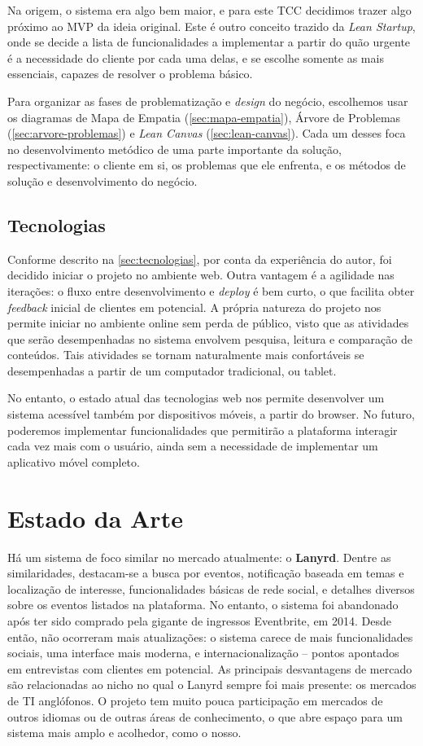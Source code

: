 \documentclass[12pt,a4paper,twoside,hyphens,english,brazil]{abntex2}
\begin{document}
Na origem, o sistema era algo bem maior, e para este TCC decidimos trazer algo próximo ao MVP da ideia original. Este é outro conceito trazido da \emph{Lean Startup}, onde se decide a lista de funcionalidades a implementar a partir do quão urgente é a necessidade do cliente por cada uma delas, e se escolhe somente as mais essenciais, capazes de resolver o problema básico.

Para organizar as fases de problematização e \emph{design} do negócio, escolhemos usar os diagramas de Mapa de Empatia (\autoref{sec:mapa-empatia}), Árvore de Problemas (\autoref{sec:arvore-problemas}) e \emph{Lean Canvas} (\autoref{sec:lean-canvas}). Cada um desses foca no desenvolvimento metódico de uma parte importante da solução, respectivamente: o cliente em si, os problemas que ele enfrenta, e os métodos de solução e desenvolvimento do negócio.

\subsection{Tecnologias}
Conforme descrito na \autoref{sec:tecnologias}, por conta da experiência do autor, foi decidido iniciar o projeto no ambiente web. Outra vantagem é a agilidade nas iterações: o fluxo entre desenvolvimento e \emph{deploy} é bem curto, o que facilita obter \emph{feedback} inicial de clientes em potencial. A própria natureza do projeto nos permite iniciar no ambiente online sem perda de público, visto que as atividades que serão desempenhadas no sistema envolvem pesquisa, leitura e comparação de conteúdos. Tais atividades se tornam naturalmente mais confortáveis se desempenhadas a partir de um computador tradicional, ou tablet.

No entanto, o estado atual das tecnologias web nos permite desenvolver um sistema acessível também por dispositivos móveis, a partir do browser. No futuro, poderemos implementar funcionalidades que permitirão a plataforma interagir cada vez mais com o usuário, ainda sem a necessidade de implementar um aplicativo móvel completo.\cite{bitbucket-mobile-milestone}

\section{Estado da Arte} \label{sec:estado_arte}
Há um sistema de foco similar no mercado atualmente: o \textbf{Lanyrd}. Dentre as similaridades, destacam-se a busca por eventos, notificação baseada em temas e localização de interesse, funcionalidades básicas de rede social, e detalhes diversos sobre os eventos listados na plataforma. No entanto, o sistema foi abandonado após ter sido comprado pela gigante de ingressos Eventbrite, em 2014.\cite{lanyrd-abandonado} Desde então, não ocorreram mais atualizações: o sistema carece de mais funcionalidades sociais, uma interface mais moderna, e internacionalização -- pontos apontados em entrevistas com clientes em potencial. As principais desvantagens de mercado são relacionadas ao nicho no qual o Lanyrd sempre foi mais presente: os mercados de TI anglófonos. O projeto tem muito pouca participação em mercados de outros idiomas ou de outras áreas de conhecimento, o que abre espaço para um sistema mais amplo e acolhedor, como o nosso.
\end{document}
